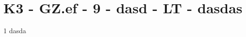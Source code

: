 \section{K3 - GZ.ef - 9 - dasd - LT - dasdas}

\begin{langesbeispiel}\item[1] %
dasda

\end{langesbeispiel}